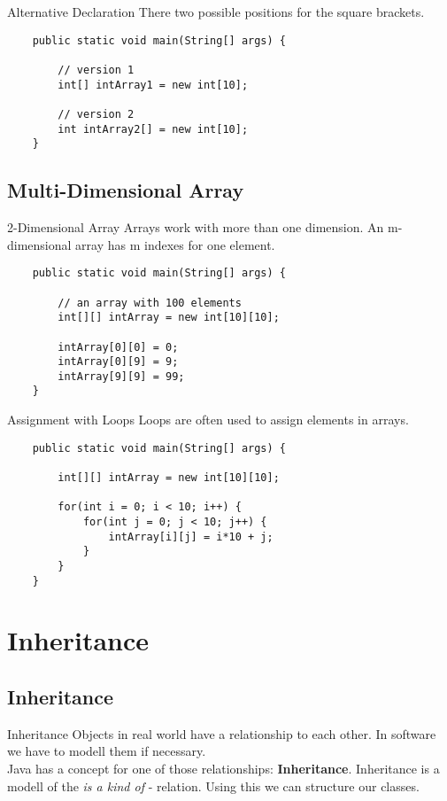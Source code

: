 \begin{frame}[fragile]{Alternative Declaration}
	There two possible positions for the square brackets. 
	\begin{lstlisting}
	public static void main(String[] args) {

	    // version 1	
	    int[] intArray1 = new int[10];
	    
	    // version 2
	    int intArray2[] = new int[10];
	}
	\end{lstlisting}
\end{frame}

\subsection{Multi-Dimensional Array}
\begin{frame}[fragile]{2-Dimensional Array}
	Arrays work with more than one dimension. 
	An m-dimensional array has m indexes for one element.
	\begin{lstlisting}
	public static void main(String[] args) {

	    // an array with 100 elements
	    int[][] intArray = new int[10][10];
	    
	    intArray[0][0] = 0;
	    intArray[0][9] = 9;
	    intArray[9][9] = 99;
	}
	\end{lstlisting}
\end{frame}

\begin{frame}[fragile]{Assignment with Loops}
	Loops are often used to assign elements in arrays.
	\begin{lstlisting}
	public static void main(String[] args) {

	    int[][] intArray = new int[10][10];
	    
	    for(int i = 0; i < 10; i++) {
	        for(int j = 0; j < 10; j++) {
	            intArray[i][j] = i*10 + j;
	        }
	    }
	}
	\end{lstlisting}
\end{frame}

\section{Inheritance}
\subsection{Inheritance}
\begin{frame}{Inheritance}
	Objects in real world have a relationship to each other.
	In software we have to modell them if necessary. \\
	\vfill
	Java has a concept for one of those relationships: \textbf{Inheritance}.
	\vfill
	Inheritance is a modell of the \emph{is a kind of} - relation.
	Using this we can structure our classes.
\end{frame}

